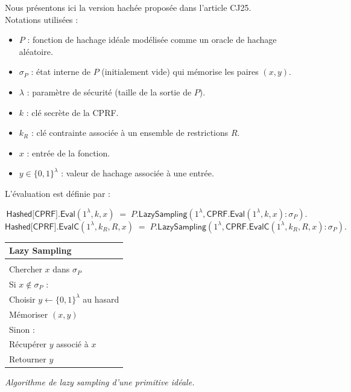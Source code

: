 \documentclass[9pt]{extarticle}
\begin{document}
Nous présentons ici la version hachée proposée dans l'article CJ25.\\

Notations utilisées :
\begin{itemize}
  \item $P$ : fonction de hachage idéale modélisée comme un oracle de hachage aléatoire.
  \item $\sigma_P$ : état interne de $P$ (initialement vide) qui mémorise les paires $(x,y)$.
  \item $\lambda$ : paramètre de sécurité (taille de la sortie de $P$).
  \item $k$ : clé secrète de la \textsf{CPRF}.
  \item $k_R$ : clé contrainte associée à un ensemble de restrictions $R$.
  \item $x$ : entrée de la fonction.
  \item $y \in \{0,1\}^{\lambda}$ : valeur de hachage associée à une entrée.
\end{itemize}

L'évaluation est définie par :

\[
\textsf{Hashed[CPRF].Eval}(1^\lambda, k, x)
\;=\;
\textsf{$P$.LazySampling}(1^\lambda, \textsf{CPRF.Eval}(1^\lambda, k, x) : \sigma_P).
\]
\[
\textsf{Hashed[CPRF].EvalC}(1^\lambda, k_R, R, x)
\;=\;
\textsf{$P$.LazySampling}(1^\lambda, \textsf{CPRF.EvalC}(1^\lambda, k_R, R, x) : \sigma_P).
\]


\begin{center}
  \begin{tabular}{l}
    \textbf{Lazy Sampling} \\
    \hline \\
    Chercher $x$ dans $\sigma_P$ \\
    Si $x \notin \sigma_P$ : \\
    \quad Choisir $y \leftarrow \{0,1\}^\lambda$ au hasard \\
    \quad Mémoriser $(x,y)$ \\
    Sinon : \\
    \quad Récupérer $y$ associé à $x$ \\
    Retourner $y$
  \end{tabular}
  
  \vspace{1ex}
  \textit{Algorithme de lazy sampling d'une primitive idéale.}
\end{center}



\end{document}
